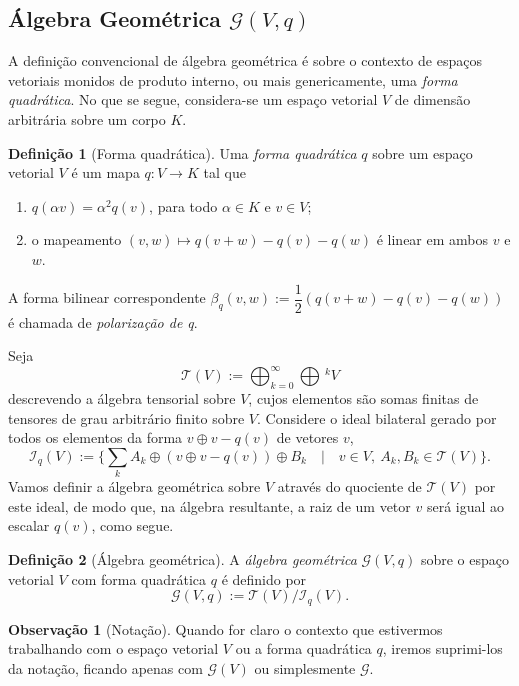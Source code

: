 \documentclass[a4paper,12pt]{report}
\theoremstyle{plain}
\theoremstyle{definition}
\newtheorem{definicao}{Definição}[section]
\newtheorem{observacao}{Observação}[section]
\begin{document}
\subsection{Álgebra Geométrica $\mathcal G(V,q)$}
A definição convencional de álgebra geométrica é sobre o contexto de espaços vetoriais monidos de produto interno, ou mais genericamente, uma \textit{forma quadrática}. No que se segue, considera-se um espaço vetorial $V$ de dimensão arbitrária sobre um corpo $K$.

\begin{definicao}[Forma quadrática]
Uma \textit{forma quadrática} $q$ sobre um espaço vetorial $V$ é um mapa $q: V\longrightarrow K$ tal que	
\begin{enumerate}
	\item $q(\alpha v) = \alpha^2q(v)$, para todo $\alpha\in K$ e $v\in V$; 
	\item o mapeamento $(v,w) \mapsto q(v+w) -q(v)-q(w)$ é linear em ambos $v$ e $w$.
\end{enumerate}
A forma bilinear correspondente $\beta_q(v,w):= \dfrac 1 2 (q(v+w)-q(v)-q(w))$ é chamada de \textit{polarização de q}.
\end{definicao}

Seja $$\mathcal{T}(V) := \bigoplus^\infty_{k=0}\bigoplus\, ^kV$$ descrevendo a álgebra tensorial sobre $V$, cujos elementos são somas finitas de tensores de grau arbitrário finito sobre $V$. Considere o ideal bilateral gerado por todos os elementos da forma $v\oplus v-q(v)$ de vetores $v$,
$$\mathcal{I}_q(V) := \{\sum_k A_k\oplus(v\oplus v-q(v))\oplus B_k \quad | \quad v\in V, \ A_k,B_k \in \mathcal{T}(V)\}.$$
Vamos definir a álgebra geométrica sobre $V$ através do quociente de $\mathcal{T}(V)$ por este ideal, de modo que, na álgebra resultante, a raiz de um vetor $v$ será igual ao escalar $q(v)$, como segue.

\begin{definicao}[Álgebra geométrica]
	A \textit{álgebra geométrica} $\mathcal{G}(V,q)$ sobre o espaço vetorial $V$ com forma quadrática $q$ é definido por $$\mathcal{G}(V,q) := \mathcal{T}(V)/\mathcal{I}_q(V).$$
\end{definicao}

\begin{observacao}[Notação]
	Quando for claro o contexto que estivermos trabalhando com o espaço vetorial $V$ ou a forma quadrática $q$, iremos suprimi-los da notação, ficando apenas com $\mathcal{G}(V)$ ou simplesmente $\mathcal{G}$.
\end{observacao}
\end{document}
